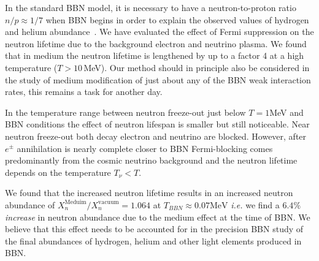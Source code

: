 In the standard BBN model, it is necessary to have a neutron-to-proton ratio $n/p\approx1/7$ when BBN begins in order to explain the observed values of hydrogen and helium abundance~\cite{Pitrou:2018cgg}. We have evaluated the effect of Fermi suppression on the neutron lifetime due to the background electron and neutrino plasma. We found that in medium the neutron lifetime is lengthened by up to a factor 4 at a high temperature ($T>10$\,MeV). Our method should in principle also be considered in the study of medium modification of just about any of the BBN weak interaction rates, this remains a task for another day.

In the temperature range between neutron freeze-out just below $T=1$\;MeV and BBN conditions the effect of neutron lifespan is smaller but still noticeable. Near neutron freeze-out both decay electron and neutrino are blocked. However, after $e^\pm$ annihilation is nearly complete closer to BBN Fermi-blocking comes predominantly from the cosmic neutrino background and the neutron lifetime depends on the temperature $T_\nu<T$.

We found that the increased neutron lifetime results in an increased neutron abundance of ${X_n^{\mathrm{Meduim}}}/{X_n^{\mathrm{vacuum}}}=1.064$ at $T_{BBN}\approx0.07 \mathrm{MeV}$ {\it i.e.\/} we find a $6.4\%$ \emph{increase} in neutron abundance due to the medium effect at the time of BBN. We believe that this effect needs to be accounted for in the precision BBN study of the final abundances of hydrogen, helium and other light elements produced in BBN.
